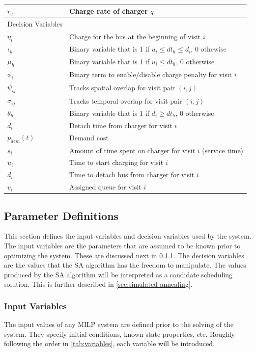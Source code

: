 \documentclass[11pt,a4paper,final]{article}
\begin{document}
\begin{table}[htbp]
\begin{tabular}{ll}
\(r_q\) & Charge rate of charger \(q\)\\[0pt]
\hline
Decision Variables & \\[0pt]
\(\eta_i\) & Charge for the bus at the beginning of visit \(i\)\\[0pt]
\(\iota_h\) & Binary variable that is 1 if \(u_i \le dt_h \le d_i\), 0 othewise\\[0pt]
\(\mu_h\) & Binary variable that is 1 if \(u_i \le dt_h\), 0 otherwise\\[0pt]
\(\phi_i\) & Binary term to enable/disable charge penalty for visit \(i\)\\[0pt]
\(\psi_{ij}\) & Tracks spatial overlap for visit pair \((i,j)\)\\[0pt]
\(\sigma_{ij}\) & Tracks temporal overlap for visit pair \((i,j)\)\\[0pt]
\(\theta_h\) & Binary variable that is 1 if \(d_i \ge dt_h\), 0 otherwise\\[0pt]
\(d_i\) & Detach time from charger for visit \(i\)\\[0pt]
\(p_{dem}(t)\) & Demand cost\\[0pt]
\(s_i\) & Amount of time spent on charger for visit \(i\) (service time)\\[0pt]
\(u_i\) & Time to start charging for visit \(i\)\\[0pt]
\(d_i\) & Time to detach bus from charger for visit \(i\)\\[0pt]
\(v_i\) & Assigned queue for visit \(i\)\\[0pt]
\hline
\end{tabular}
\end{table}

\subsection{Parameter Definitions}
\label{sec:parameter-definitions}
This section defines the input variables and decision variables used by the system. The input variables are the
parameters that are assumed to be known prior to optimizing the system. These are discussed next in
\ref{sec:input-variables}. The decision variables are the values that the SA algorithm has the freedom to manipulate. The
values produced by the SA algorithm will be interpreted as a candidate scheduling solution. This is further described in
\ref{sec:simulated-annealing}.

\subsubsection{Input Variables}
\label{sec:input-variables}
The input values of any MILP system are defined prior to the solving of the system. They specify initial conditions,
known state properties, etc. Roughly following the order in \ref{tab:variables}, each variable will be introduced.
\end{document}
